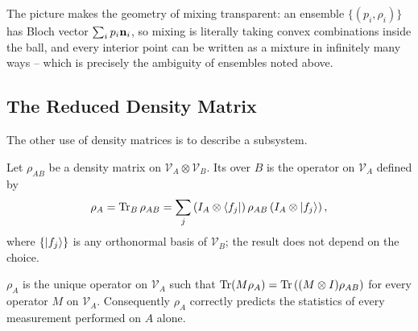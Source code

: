 \documentclass[a4paper]{scrartcl}
\newcommand{\Vs}{\mathcal{V}}
\begin{document}
\begin{center}
\end{center}

The picture makes the geometry of mixing transparent: an ensemble $\{(p_i,\rho_i)\}$ has Bloch vector $\sum_ip_i\mathbf{n}_i$, so mixing is literally taking convex combinations inside the ball, and every interior point can be written as a mixture in infinitely many ways -- which is precisely the ambiguity of ensembles noted above.

\subsection{The Reduced Density Matrix}\label{sec:reduced}

The other use of density matrices is to describe a subsystem.

\begin{definition}
	Let $\rho_{AB}$ be a density matrix on $\Vs_A\otimes\Vs_B$. Its  over $B$ is the operator on $\Vs_A$ defined by
	$$\rho_A = \Tr_B\rho_{AB} = \sum_j\left(I_A\otimes\bra{f_j}\right)\rho_{AB}\left(I_A\otimes\ket{f_j}\right),$$
	where $\{\ket{f_j}\}$ is any orthonormal basis of $\Vs_B$; the result does not depend on the choice.
\end{definition}

\begin{proposition}
	$\rho_A$ is the unique operator on $\Vs_A$ such that $\Tr(M\rho_A) = \Tr\left((M\otimes I)\rho_{AB}\right)$ for every operator $M$ on $\Vs_A$. Consequently $\rho_A$ correctly predicts the statistics of every measurement performed on $A$ alone.
\end{proposition}
\end{document}
